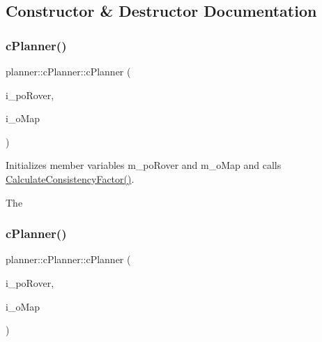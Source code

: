 \subsection{Constructor \& Destructor Documentation}
\mbox{\label{classplanner_1_1c_planner_a381d86c14532f65cf21cb80b4c64ce0e}} 
\subsubsection{\texorpdfstring{c\+Planner()}{cPlanner()}\hspace{0.1cm}{\footnotesize\ttfamily [1/2]}}
{\footnotesize\ttfamily planner\+::c\+Planner\+::c\+Planner (\begin{DoxyParamCaption}\item[{std\+::shared\+\_\+ptr$<$ \mbox{\hyperlink{classplanner_1_1c_rover_interface}{c\+Rover\+Interface}}$<$ 8 $>$$>$}]{i\+\_\+po\+Rover,  }\item[{std\+::shared\+\_\+ptr$<$ \mbox{\hyperlink{classplanner_1_1c_graph}{c\+Graph}} $>$}]{i\+\_\+o\+Map }\end{DoxyParamCaption})}



Initializes member variables m\+\_\+po\+Rover and m\+\_\+o\+Map and calls \mbox{\hyperlink{classplanner_1_1c_planner_a2e5a745f83f903662eff914d8beddb5e}{Calculate\+Consistency\+Factor()}}. 

The \mbox{\label{classplanner_1_1c_planner_a381d86c14532f65cf21cb80b4c64ce0e}} 
\subsubsection{\texorpdfstring{c\+Planner()}{cPlanner()}\hspace{0.1cm}{\footnotesize\ttfamily [2/2]}}
{\footnotesize\ttfamily planner\+::c\+Planner\+::c\+Planner (\begin{DoxyParamCaption}\item[{std\+::shared\+\_\+ptr$<$ \mbox{\hyperlink{classplanner_1_1c_rover_interface}{c\+Rover\+Interface}}$<$ 8 $>$$>$}]{i\+\_\+po\+Rover,  }\item[{std\+::shared\+\_\+ptr$<$ \mbox{\hyperlink{classplanner_1_1c_graph}{c\+Graph}} $>$}]{i\+\_\+o\+Map }\end{DoxyParamCaption})}



